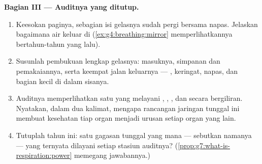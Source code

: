 \begin{problem}
\medskip\noindent\textbf{Bagian III --- Auditnya yang ditutup.}
\begin{enumerate}[resume]
  \item Keesokan paginya, sebagian isi gelasnya sudah pergi bersama
        napas. Jelaskan bagaimana air keluar di 
        (\cref{ex:g4:breathing:mirror} memperlihatkannya bertahun-tahun
        yang lalu).
  \item Susunlah pembukuan lengkap gelasnya: masuknya, simpanan dan
        pemakaiannya, serta keempat jalan keluarnya --- ,
        keringat, napas, dan bagian kecil di dalam sisanya.
  \item Auditnya memperlihatkan satu  yang melayani ,
        , ,  dan  secara bergiliran.
        Nyatakan, dalam dua kalimat, mengapa rancangan jaringan
        tunggal ini membuat kesehatan tiap organ menjadi urusan setiap
        organ yang lain.
  \item Tutuplah tahun ini: satu gagasan tunggal yang mana ---
        sebutkan namanya --- yang ternyata dilayani setiap stasiun
        auditnya? (\cref{prop:g7:what-is-respiration:power} memegang
        jawabannya.)
\end{enumerate}
\end{problem}
